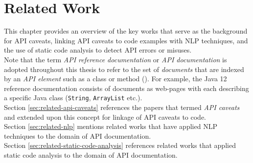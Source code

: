 \chapter{Related Work}
\label{cha:background}
This chapter provides an overview of the key works that serve as the background for API caveats, linking API caveats to code examples with NLP techniques, and the use of static code analysis to detect API errors or misuses. \\
Note that the term \textit{API reference documentation} or \textit{API documentation} is adopted throughout this thesis to refer to the set of \textit{documents} that are indexed by an \textit{API element} such as a class or method (\cite{maalej2013patterns}). For example, the Java 12 reference documentation consists of documents as web-pages with each describing a specific Java class (\lstinline{String}, \lstinline{ArrayList} etc.). \\

Section \ref{sec:related-api-caveats} references the papers that termed \textit{API caveats} and extended upon this concept for linkage of API caveats to code.\\

Section \ref{sec:related-nlp} mentions related works that have applied NLP techniques to the domain of API documentation.\\

Section \ref{sec:related-static-code-analysis} references related works that applied static code analysis to the domain of API documentation.\\


